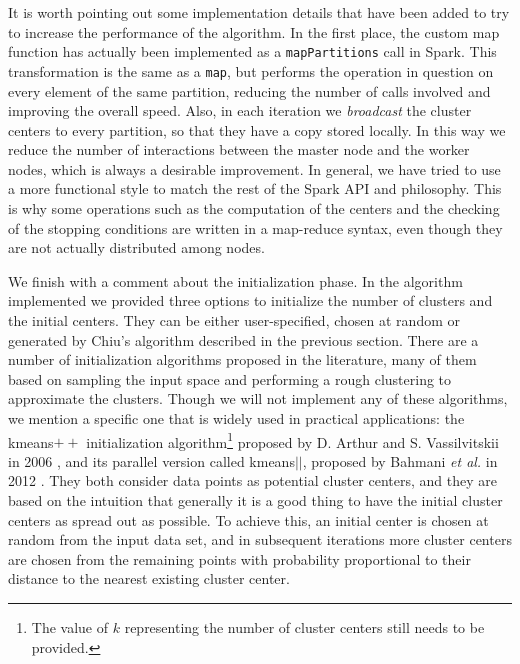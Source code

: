 It is worth pointing out some implementation details that have been added to try to increase the performance of the algorithm. In the first place, the custom map function has actually been implemented as a \verb|mapPartitions| call in Spark. This transformation is the same as a \verb|map|, but performs the operation in question on every element of the same partition, reducing the number of calls involved and improving the overall speed. Also, in each iteration we \textit{broadcast} the cluster centers to every partition, so that they have a copy stored locally. In this way we reduce the number of interactions between the master node and the worker nodes, which is always a desirable improvement. In general, we have tried to use a more functional style to match the rest of the Spark API and philosophy. This is why some operations such as the computation of the centers and the checking of the stopping conditions are written in a map-reduce syntax, even though they are not actually distributed among nodes.

We finish with a comment about the initialization phase. In the algorithm implemented we provided three options to initialize the number of clusters and the initial centers. They can be either user-specified, chosen at random or generated by Chiu's algorithm described in the previous section. There are a number of initialization algorithms proposed in the literature, many of them based on sampling the input space and performing a rough clustering to approximate the clusters. Though we will not implement any of these algorithms, we mention a specific one that is widely used in practical applications: the kmeans$++$ initialization algorithm\footnote{The value of $k$ representing the number of cluster centers still needs to be provided.} proposed by D. Arthur and S. Vassilvitskii in 2006 \cite{arthur2006k}, and its parallel version called kmeans$||$, proposed by Bahmani \textit{et al.} in 2012 \cite{bahmani2012scalable}. They both consider data points as potential cluster centers, and they are based on the intuition that generally it is a good thing to have the initial cluster centers as spread out as possible. To achieve this, an initial center is chosen at random from the input data set, and in subsequent iterations more cluster centers are chosen from the remaining points with probability proportional to their distance to the nearest existing cluster center.
